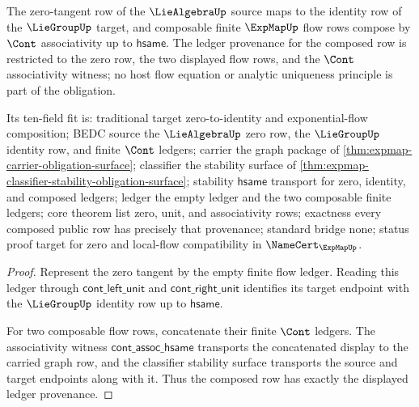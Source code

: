 \begin{theorem}
\label{thm:expmap-zero-flow-obligation-surface}
The zero-tangent row of the $\LieAlgebraUp$ source maps to the identity row of the $\LieGroupUp$ target, and composable finite $\ExpMapUp$ flow rows compose by $\Cont$ associativity up to $\mathsf{hsame}$. The ledger provenance for the composed row is restricted to the zero row, the two displayed flow rows, and the $\Cont$ associativity witness; no host flow equation or analytic uniqueness principle is part of the obligation.

Its ten-field fit is: traditional target zero-to-identity and exponential-flow composition; BEDC source the $\LieAlgebraUp$ zero row, the $\LieGroupUp$ identity row, and finite $\Cont$ ledgers; carrier the graph package of \autoref{thm:expmap-carrier-obligation-surface}; classifier the stability surface of \autoref{thm:expmap-classifier-stability-obligation-surface}; stability $\mathsf{hsame}$ transport for zero, identity, and composed ledgers; ledger the empty ledger and the two composable finite ledgers; core theorem list zero, unit, and associativity rows; exactness every composed public row has precisely that provenance; standard bridge none; status proof target for zero and local-flow compatibility in $\NameCert_{\ExpMapUp}$.
\end{theorem}
\begin{proof}
Represent the zero tangent by the empty finite flow ledger. Reading this ledger through $\mathsf{cont\_left\_unit}$ and $\mathsf{cont\_right\_unit}$ identifies its target endpoint with the $\LieGroupUp$ identity row up to $\mathsf{hsame}$.

For two composable flow rows, concatenate their finite $\Cont$ ledgers. The associativity witness $\mathsf{cont\_assoc\_hsame}$ transports the concatenated display to the carried graph row, and the classifier stability surface transports the source and target endpoints along with it. Thus the composed row has exactly the displayed ledger provenance.
\end{proof}

